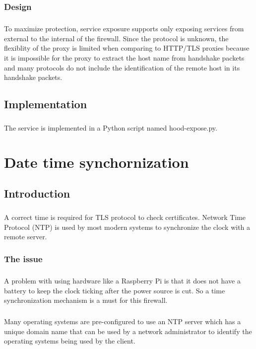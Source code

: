 \documentclass[mscthesis]{usiinfthesis}
\begin{document}
\subsection{Design}
\paragraph{}
To maximize protection, service exposure supports only exposing services from external to the internal of the firewall. Since the protocol is unknown, the flexiblity of the proxy is limited when comparing to HTTP/TLS proxies because it is impossible for the proxy to extract the host name from handshake packets and many protocols do not include the identification of the remote host in its handshake packets.

\section{Implementation}
\paragraph{}
The service is implemented in a Python script named hood-expose.py.


\chapter{Date time synchornization}\label{cha:time}
\section{Introduction}
\paragraph{}
A correct time is required for TLS protocol to check certificates. Network Time Protocol (NTP) is used by most modern systems to synchronize the clock with a remote server.
\subsection{The issue}
\paragraph{}
A problem with using hardware like a Raspberry Pi is that it does not have a battery to keep the clock ticking after the power source is cut. So a time synchronization mechanism is a must for this firewall.
\paragraph{}
Many operating systems are pre-configured to use an NTP server which has a unique domain name that can be used by a network administrator to identify the operating systems being used by the client.
\end{document}
